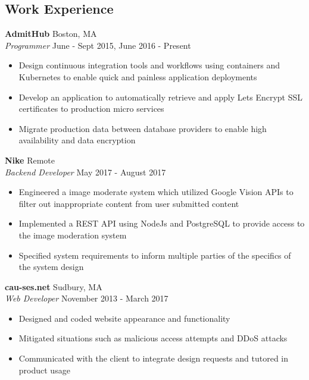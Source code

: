 \documentclass[10pt]{article}
\begin{document}
\begin{flushleft}
\section{Work Experience}
	\textbf{AdmitHub} \hfill Boston, MA \\
	\textit{Programmer} \hfill June - Sept 2015, June 2016 - Present \\
	\begin{itemize}
		\item Design continuous integration tools and workflows using 
		      containers and Kubernetes to enable quick and painless 
		      application deployments
		\item Develop an application to automatically retrieve and apply 
		      Lets Encrypt SSL certificates to production micro services
		\item Migrate production data between database providers to 
		      enable high availability and data encryption
	\end{itemize}

	\vspace{1em}
	\textbf{Nike} \hfill Remote \\
	\textit{Backend Developer} \hfill May 2017 - August 2017 \\
	\begin{itemize}
		\item Engineered a image moderate system which utilized Google 
		      Vision APIs to filter out inappropriate content from user 
		      submitted content
		\item Implemented a REST API using NodeJs and PostgreSQL to 
		      provide access to the image moderation system
		\item Specified system requirements to inform multiple parties 
		      of the specifics of the system design
	\end{itemize}

	\vspace{1em}
	\textbf{cau-ses.net} \hfill Sudbury, MA \\
	\textit{Web Developer} \hfill November 2013 - March 2017 \\
	\begin{itemize}
		\item Designed and coded website appearance and functionality
		\item Mitigated situations such as malicious access attempts and DDoS attacks
		\item Communicated with the client to integrate design requests and tutored in product usage
	\end{itemize}


\end{flushleft}
\end{document}
